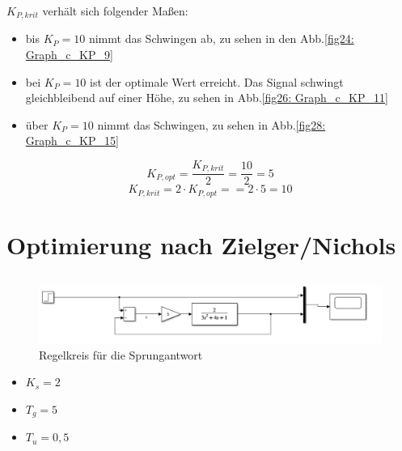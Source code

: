 \documentclass{article}
\begin{document}
			\subsubsection{}
				$K_{P,krit}$ verhält sich folgender Maßen:
				\begin{itemize}
					\item bis $K_P = 10$ nimmt das Schwingen ab, zu sehen in den Abb.\ref{fig24: Graph_c_KP_9}
					\item bei $K_P = 10$ ist der optimale Wert erreicht. Das Signal schwingt gleichbleibend auf einer Höhe, zu sehen in Abb.\ref{fig26: Graph_c_KP_11}
					\item über $K_P = 10$ nimmt das Schwingen, zu sehen in Abb.\ref{fig28: Graph_c_KP_15}
				\end{itemize}
				$$K_{P,opt} = \frac{K_{P,krit}}{2} = \frac{10}{2} = 5$$
				$$K_{P,krit} = 2 \cdot K_{P,opt} == 2 \cdot 5 = 10$$
\newpage
	\section{Optimierung nach Zielger/Nichols}
		\subsection{}
			\begin{figure}[h]
				\includegraphics[scale=0.25, center]{3_a_Regelkreis.png}
				\caption{Regelkreis für die Sprungantwort}
				\label{fig30: Regelkreis}
			\end{figure}
			\begin{itemize}
				\item $K_s = 2$
				\item $T_g = 5$
				\item $T_u = 0,5$
			\end{itemize}
\end{document}

